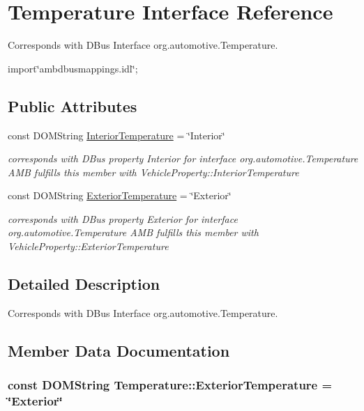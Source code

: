 \hypertarget{interfaceTemperature}{\section{Temperature Interface Reference}
\label{interfaceTemperature}
}


Corresponds with D\+Bus Interface org.\+automotive.\+Temperature.  




{\ttfamily import\char`\"{}ambdbusmappings.\+idl\char`\"{};}

\subsection*{Public Attributes}
\begin{DoxyCompactItemize}
\item 
const D\+O\+M\+String \hyperlink{interfaceTemperature_aa5249b5e464e788f5d4f1b2614c5be54}{Interior\+Temperature} = \char`\"{}Interior\char`\"{}
\begin{DoxyCompactList}\small\item\em corresponds with D\+Bus property Interior for interface org.\+automotive.\+Temperature A\+M\+B fulfills this member with Vehicle\+Property\+::\+Interior\+Temperature \end{DoxyCompactList}\item 
const D\+O\+M\+String \hyperlink{interfaceTemperature_abdf63b22d961bf4ba275daf5da750c45}{Exterior\+Temperature} = \char`\"{}Exterior\char`\"{}
\begin{DoxyCompactList}\small\item\em corresponds with D\+Bus property Exterior for interface org.\+automotive.\+Temperature A\+M\+B fulfills this member with Vehicle\+Property\+::\+Exterior\+Temperature \end{DoxyCompactList}\end{DoxyCompactItemize}


\subsection{Detailed Description}
Corresponds with D\+Bus Interface org.\+automotive.\+Temperature. 

\subsection{Member Data Documentation}
\hypertarget{interfaceTemperature_abdf63b22d961bf4ba275daf5da750c45}{
\subsubsection[{Exterior\+Temperature}]{\setlength{\rightskip}{0pt plus 5cm}const D\+O\+M\+String Temperature\+::\+Exterior\+Temperature = \char`\"{}Exterior\char`\"{}}}\label{interfaceTemperature_abdf63b22d961bf4ba275daf5da750c45}



